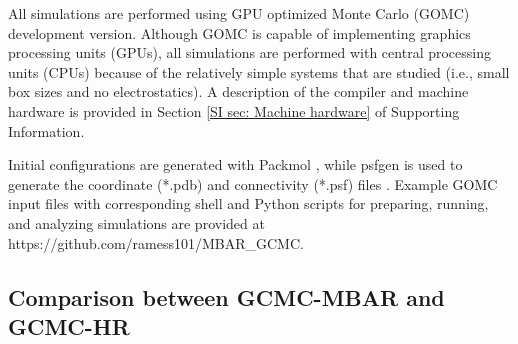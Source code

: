 \documentclass[journal=jced,manuscript=article]{achemso}
\begin{document}
All simulations are performed using GPU optimized Monte Carlo (GOMC) \cite{Nejahi2018} development version. Although GOMC is capable of implementing graphics processing units (GPUs), all simulations are performed with central processing units (CPUs) because of the relatively simple systems that are studied (i.e., small box sizes and no electrostatics). A description of the compiler and machine hardware is provided in Section \ref{SI sec: Machine hardware} of Supporting Information.



Initial configurations are generated with Packmol \cite{PACKMOL}, while psfgen is used to generate the coordinate (*.pdb) and connectivity (*.psf) files \cite{VMD}. Example GOMC input files with corresponding shell and Python scripts for preparing, running, and analyzing simulations are provided at https://github.com/ramess101/MBAR\_GCMC.



\subsection{Comparison between GCMC-MBAR and GCMC-HR} \label{sec: GCMC-HR and GCMC-MBAR}
\end{document}
